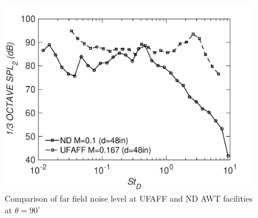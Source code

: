 \begin{figure}
	\begin{center}
		\centerline{\includegraphics[scale=0.7]{figures/nd_ufaff}}
		\caption{Comparison of far field noise level at UFAFF and ND AWT facilities at $\theta = 90^\circ$}
		\label{fig:farfield}
	\end{center}
\end{figure}

